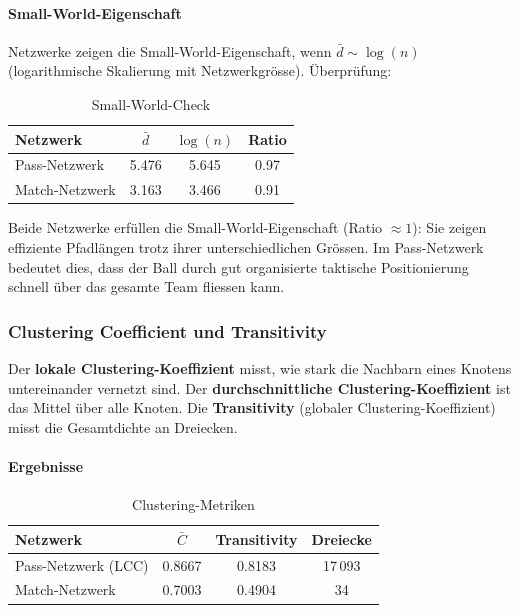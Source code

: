 \paragraph{Small-World-Eigenschaft}
Netzwerke zeigen die Small-World-Eigenschaft, wenn $\bar{d} \sim \log(n)$ (logarithmische Skalierung mit Netzwerkgrösse). Überprüfung:

\begin{table}[h]
\centering
\caption{Small-World-Check}
\label{tab:small_world_check}
\begin{tabular}{lccc}
\toprule
\textbf{Netzwerk} & \textbf{$\bar{d}$} & \textbf{$\log(n)$} & \textbf{Ratio} \\
\midrule
Pass-Netzwerk & 5.476 & 5.645 & 0.97 \\
Match-Netzwerk & 3.163 & 3.466 & 0.91 \\
\bottomrule
\end{tabular}
\end{table}

Beide Netzwerke erfüllen die Small-World-Eigenschaft (Ratio $\approx 1$): Sie zeigen effiziente Pfadlängen trotz ihrer unterschiedlichen Grössen. Im Pass-Netzwerk bedeutet dies, dass der Ball durch gut organisierte taktische Positionierung schnell über das gesamte Team fliessen kann.

\subsubsection{Clustering Coefficient und Transitivity}

Der \textbf{lokale Clustering-Koeffizient} misst, wie stark die Nachbarn eines Knotens untereinander vernetzt sind. Der \textbf{durchschnittliche Clustering-Koeffizient} ist das Mittel über alle Knoten. Die \textbf{Transitivity} (globaler Clustering-Koeffizient) misst die Gesamtdichte an Dreiecken.

\paragraph{Ergebnisse}

\begin{table}[h]
\centering
\caption{Clustering-Metriken}
\label{tab:clustering_metrics}
\begin{tabular}{lccc}
\toprule
\textbf{Netzwerk} & \textbf{$\bar{C}$} & \textbf{Transitivity} & \textbf{Dreiecke} \\
\midrule
Pass-Netzwerk (LCC) & 0.8667 & 0.8183 & 17\,093 \\
Match-Netzwerk & 0.7003 & 0.4904 & 34 \\
\bottomrule
\end{tabular}
\end{table}

